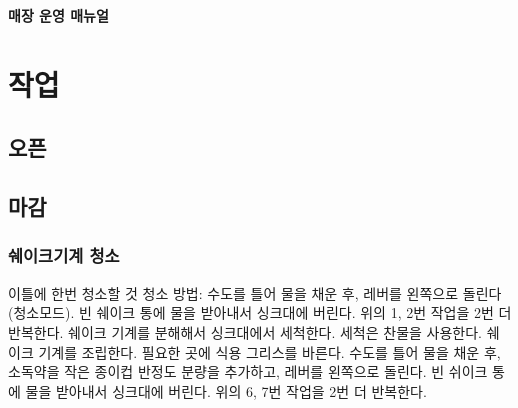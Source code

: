 \documentclass{myproc}
\begin{document}
\small

\begin{center}
  \textcolor{blue2}{\large\bf 매장 운영 매뉴얼}
\end{center}

\section{작업}
\subsection{오픈}
\subsection{마감}
\subsubsection{쉐이크기계 청소}
\bit
\w 이틀에 한번 청소할 것
\w 청소 방법:
  \ben
  \w 수도를 틀어 물을 채운 후, 레버를 왼쪽으로 돌린다 (청소모드).
  \w 빈 쉐이크 통에 물을 받아내서 싱크대에 버린다. 
  \w 위의 1, 2번 작업을 2번 더 반복한다.
  \w 쉐이크 기계를 분해해서 싱크대에서 세척한다. 세척은 찬물을 사용한다.
  \w 쉐이크 기계를 조립한다. 필요한 곳에 식용 그리스를 바른다.
  \w 수도를 틀어 물을 채운 후, 소독약을 작은 종이컵 반정도 분량을 추가하고,
  레버를 왼쪽으로 돌린다.
  \w 빈 쉬이크 통에 물을 받아내서 싱크대에 버린다.
  \w 위의 6, 7번 작업을 2번 더 반복한다.
  \een
\eit


\tableofcontents
\end{document}
